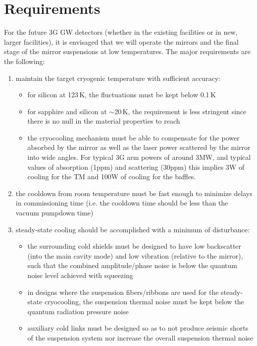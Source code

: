 \section{Requirements}
For the future 3G GW detectors (whether in the existing facilities or in new, larger facilities), it is envisaged that we will operate the mirrors and the final stage of the mirror suspensions at low temperatures.
The major requirements are the following:
\begin{enumerate}
\item maintain the target cryogenic temperature with sufficient accuracy:
      \begin{itemize}
        \item for silicon at 123\,K, the fluctuations must be kept below 0.1\,K
        \item for sapphire and silicon at $\sim$20\,K, the requirement is less stringent since there is no null in the material properties to reach
        \item the cryocooling mechanism must be able to compensate for the power absorbed by the mirror as well as the laser power scattered by the mirror into wide angles. For typical 3G arm powers of around 3MW, and typical values of absorption (1ppm) and scattering (30ppm) this implies 3W of cooling for the TM and 100W of cooling for the baffles.
      \end{itemize}

\item the cooldown from room temperature must be fast enough to minimize delays in commissioning time (i.e. the cooldown time should be less than the vacuum pumpdown time)

\item steady-state cooling should be accomplished with a minimum of disturbance:
      \begin{itemize}
        \item the surrounding cold shields must be designed to have low backscatter (into the main cavity mode) and low vibration (relative to the mirror), such that the combined amplitude/phase noise is below the quantum noise level achieved with squeezing
        \item in designs where the suspension fibers/ribbons are used for the steady-state cryocooling, the suspension thermal noise must be kept below the quantum radiation pressure noise
        \item auxiliary cold links must be designed so as to not produce seismic shorts of the suspension system nor increase the overall suspension thermal noise

      \end{itemize}
\end{enumerate}

